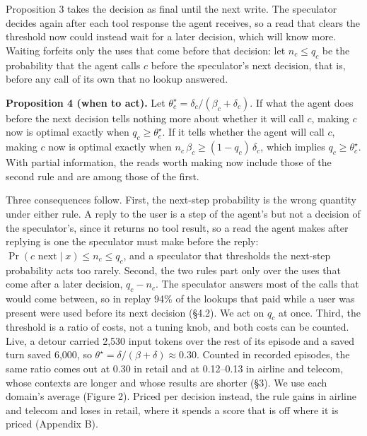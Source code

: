 \documentclass[10pt,twocolumn,letterpaper]{article}
\newcommand{\runin}[1]{{\sffamily\bfseries\color{accent}#1}}
\begin{document}
Proposition 3 takes the decision as final until the next write. The speculator decides again after each tool response the agent receives, so a read that clears the threshold now could instead wait for a later decision, which will know more. Waiting forfeits only the uses that come before that decision: let \(n_c \le q_c\) be the probability that the agent calls \(c\) before the speculator's next decision, that is, before any call of its own that no lookup answered.

\begin{prop}
\runin{Proposition 4 (when to act).} Let \(\theta^\star_c = \delta_c/(\beta_c+\delta_c)\). If what the agent does before the next decision tells nothing more about whether it will call \(c\), making \(c\) now is optimal exactly when \(q_c \ge \theta^\star_c\). If it tells whether the agent will call \(c\), making \(c\) now is optimal exactly when \(n_c\,\beta_c \ge (1-q_c)\,\delta_c\), which implies \(q_c \ge \theta^\star_c\). With partial information, the reads worth making now include those of the second rule and are among those of the first.
\end{prop}

Three consequences follow. First, the next-step probability is the wrong quantity under either rule. A reply to the user is a step of the agent's but not a decision of the speculator's, since it returns no tool result, so a read the agent makes after replying is one the speculator must make before the reply: \(\Pr(c \text{ next} \mid x) \le n_c \le q_c\), and a speculator that thresholds the next-step probability acts too rarely. Second, the two rules part only over the uses that come after a later decision, \(q_c - n_c\). The speculator answers most of the calls that would come between, so in replay 94\% of the lookups that paid while a user was present were used before its next decision (§4.2). We act on \(q_c\) at once. Third, the threshold is a ratio of costs, not a tuning knob, and both costs can be counted. Live, a detour carried 2,530 input tokens over the rest of its episode and a saved turn saved 6,000, so \(\theta^\star = \delta/(\beta+\delta) \approx 0.30\). Counted in recorded episodes, the same ratio comes out at 0.30 in retail and at 0.12--0.13 in airline and telecom, whose contexts are longer and whose results are shorter (§3). We use each domain's average (Figure 2). Priced per decision instead, the rule gains in airline and telecom and loses in retail, where it spends a score that is off where it is priced (Appendix B).
\end{document}

